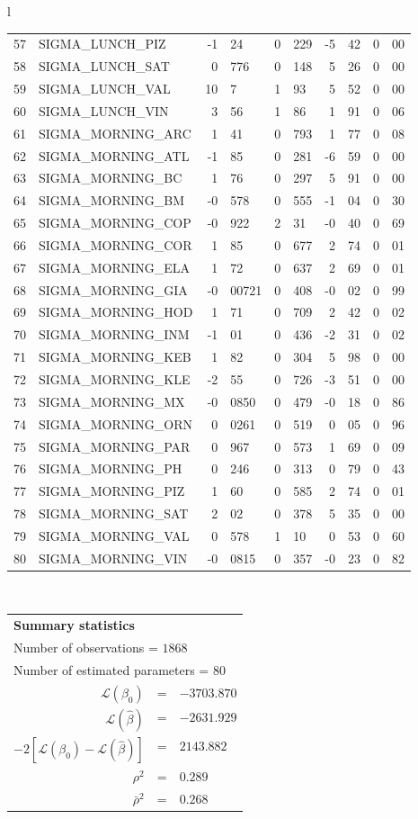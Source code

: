 \begin{tabular}{l}
\begin{tabular}{rlr@{.}lr@{.}lr@{.}lr@{.}l}
57 & SIGMA_LUNCH_PIZ  & -1&24 & 0&229 & -5&42 & 0&00\\
58 & SIGMA_LUNCH_SAT  & 0&776 & 0&148 & 5&26 & 0&00\\
59 & SIGMA_LUNCH_VAL  & 10&7 & 1&93 & 5&52 & 0&00\\
60 & SIGMA_LUNCH_VIN & 3&56 & 1&86 & 1&91 & 0&06\\
61 & SIGMA_MORNING_ARC & 1&41 & 0&793 & 1&77 & 0&08\\
62 & SIGMA_MORNING_ATL  & -1&85 & 0&281 & -6&59 & 0&00\\
63 & SIGMA_MORNING_BC & 1&76 & 0&297 & 5&91 & 0&00\\
64 & SIGMA_MORNING_BM & -0&578 & 0&555 & -1&04 & 0&30\\
65 & SIGMA_MORNING_COP & -0&922 & 2&31 & -0&40 & 0&69\\
66 & SIGMA_MORNING_COR  & 1&85 & 0&677 & 2&74 & 0&01\\
67 & SIGMA_MORNING_ELA & 1&72 & 0&637 & 2&69 & 0&01\\
68 & SIGMA_MORNING_GIA  & -0&00721 & 0&408 & -0&02 & 0&99\\
69 & SIGMA_MORNING_HOD  & 1&71 & 0&709 & 2&42 & 0&02\\
70 & SIGMA_MORNING_INM  & -1&01 & 0&436 & -2&31 & 0&02\\
71 & SIGMA_MORNING_KEB  & 1&82 & 0&304 & 5&98 & 0&00\\
72 & SIGMA_MORNING_KLE & -2&55 & 0&726 & -3&51 & 0&00\\
73 & SIGMA_MORNING_MX  & -0&0850 & 0&479 & -0&18 & 0&86\\
74 & SIGMA_MORNING_ORN  & 0&0261 & 0&519 & 0&05 & 0&96\\
75 & SIGMA_MORNING_PAR  & 0&967 & 0&573 & 1&69 & 0&09\\
76 & SIGMA_MORNING_PH  & 0&246 & 0&313 & 0&79 & 0&43\\
77 & SIGMA_MORNING_PIZ  & 1&60 & 0&585 & 2&74 & 0&01\\
78 & SIGMA_MORNING_SAT  & 2&02 & 0&378 & 5&35 & 0&00\\
79 & SIGMA_MORNING_VAL  & 0&578 & 1&10 & 0&53 & 0&60\\
80 & SIGMA_MORNING_VIN & -0&0815 & 0&357 & -0&23 & 0&82\\
\hline
\end{tabular}
\\
\begin{tabular}{rcl}
\multicolumn{3}{l}{\bf Summary statistics}\\
\multicolumn{3}{l}{ Number of observations = $1868$} \\
\multicolumn{3}{l}{ Number of estimated  parameters = $80$} \\
 $\mathcal{L}(\beta_0)$ &=&  $-3703.870$ \\
 $\mathcal{L}(\hat{\beta})$ &=& $-2631.929 $  \\
 $-2[\mathcal{L}(\beta_0) -\mathcal{L}(\hat{\beta})]$ &=& $2143.882$ \\
    $\rho^2$ &=&   $0.289$ \\
    $\bar{\rho}^2$ &=&    $0.268$ \\
\end{tabular}
  \end{tabular}
